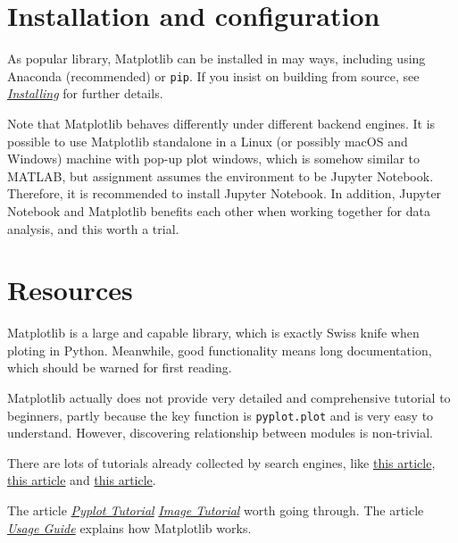 \documentclass[english]{../TeXTemplate/pkupaper}
\title{\titlemark}
\author{pppppass}
\date{Updated on March 12, 2018}
\begin{document}
\maketitle

\section{Installation and configuration}

As popular library, Matplotlib can be installed in may ways, including using Anaconda (recommended) or \verb"pip". If you insist on building from source, see \href{https://matplotlib.org/users/installing.html}{\emph{Installing}} for further details.

Note that Matplotlib behaves differently under different backend engines. It is possible to use Matplotlib standalone in a Linux (or possibly macOS and Windows) machine with pop-up plot windows, which is somehow similar to MATLAB, but assignment assumes the environment to be Jupyter Notebook. Therefore, it is recommended to install Jupyter Notebook. In addition, Jupyter Notebook and Matplotlib benefits each other when working together for data analysis, and this worth a trial.

\section{Resources}

Matplotlib is a large and capable library, which is exactly Swiss knife when ploting in Python. Meanwhile, good functionality means long documentation, which should be warned for first reading.

Matplotlib actually does not provide very detailed and comprehensive tutorial to beginners, partly because the key function is \verb"pyplot.plot" and is very easy to understand. However, discovering relationship between modules is non-trivial.

There are lots of tutorials already collected by search engines, like \href{https://liam0205.me/2014/09/11/matplotlib-tutorial-zh-cn/}{this article}, \href{https://www.jianshu.com/p/7fbecf5255f0}{this article} and \href{http://codingpy.com/article/a-quick-intro-to-matplotlib/}{this article}.

The article \href{https://matplotlib.org/tutorials/introductory/pyplot.html}{\emph{Pyplot Tutorial}} \href{https://matplotlib.org/tutorials/introductory/images.html}{\emph{Image Tutorial}} worth going through. The article \href{https://matplotlib.org/tutorials/introductory/usage.html}{\emph{Usage Guide}} explains how Matplotlib works.
\end{document}
